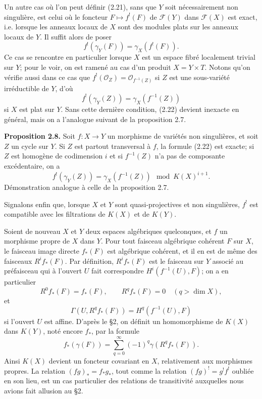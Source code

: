 \documentclass[11pt]{article}
\providecommand{\cF}{\mathscr F}
\providecommand{\cO}{\mathcal O}
\begin{document}
Un autre cas où l'on peut définir (2.21), sans que $Y$ soit nécessairement non singulière, est celui où le foncteur $F\mapsto f^!(F)$ de $\cF(Y)$ dans $\cF(X)$ est exact, i.e. lorsque les anneaux locaux de $X$ sont des modules plats sur les anneaux locaux de $Y$. Il suffit alors de poser
\[
 f^!(\gamma_Y(F))=\gamma_X(f^!(F)).
\]
Ce cas se rencontre en particulier lorsque $X$ est un espace fibré localement trivial sur $Y$; pour le voir, on est ramené au cas d'un produit $X=Y\times T$. Notons qu'on vérifie aussi dans ce cas que $f^!(\cO_Z)=\cO_{f^{-1}(Z)}$ si $Z$ est une sous-variété irréductible de $Y$, d'où
\begin{equation}\tag{2.22}
 f^!(\gamma_Y(Z))=\gamma_X(f^{-1}(Z))
\end{equation}
si $X$ est plat sur $Y$. Sans cette dernière condition, (2.22) devient inexacte en général, mais on a l'analogue suivant de la proposition 2.7.

\textbf{Proposition 2.8.} Soit $f:X\to Y$ un morphisme de variétés non singulières, et soit $Z$ un cycle sur $Y$. Si $Z$ est partout transversal à $f$, la formule (2.22) est exacte; si $Z$ est homogène de codimension $i$ et si $f^{-1}(Z)$ n'a pas de composante excédentaire, on a
\begin{equation}\tag{2.23}
 f^!(\gamma_Y(Z))=\gamma_X(f^{-1}(Z))\mod K(X)^{i+1}.
\end{equation}
Démonstration analogue à celle de la proposition 2.7.

Signalons enfin que, lorsque $X$ et $Y$ sont quasi-projectives et non singulières, $f^!$ est compatible avec les filtrations de $K(X)$ et de $K(Y)$.

Soient de nouveau $X$ et $Y$ deux espaces algébriques quelconques, et $f$ un morphisme propre de $X$ dans $Y$. Pour tout faisceau algébrique cohérent $F$ sur $X$, le faisceau image directe $f_*(F)$ est algébrique cohérent, et il en est de même des faisceaux $R^if_*(F)$. Par définition, $R^if_*(F)$ est le faisceau sur $Y$ associé au préfaisceau qui à l'ouvert $U$ fait correspondre $H^i(f^{-1}(U),F)$; on a en particulier
\begin{equation}\tag{2.24}
 R^0f_*(F)=f_*(F),\qquad R^qf_*(F)=0\quad(q>\dim X),
\end{equation}
et
\begin{equation}\tag{2.25}
 \Gamma(U,R^qf_*(F))=H^q(f^{-1}(U),F)
\end{equation}
si l'ouvert $U$ est affine. D'après le \S 2, on définit un homomorphisme de $K(X)$ dans $K(Y)$, noté encore $f_*$, par la formule
\begin{equation}\tag{2.26}
 f_*(\gamma(F))=\sum_{q=0}^{\infty}(-1)^q\gamma(R^qf_*(F)).
\end{equation}
Ainsi $K(X)$ devient un foncteur covariant en $X$, relativement aux morphismes propres. La relation $(fg)_*=f_*g_*$, tout comme la relation $(fg)^!=g^!f^!$ oubliée en son lieu, est un cas particulier des relations de transitivité auxquelles nous avions fait allusion au \S 2.
\end{document}
